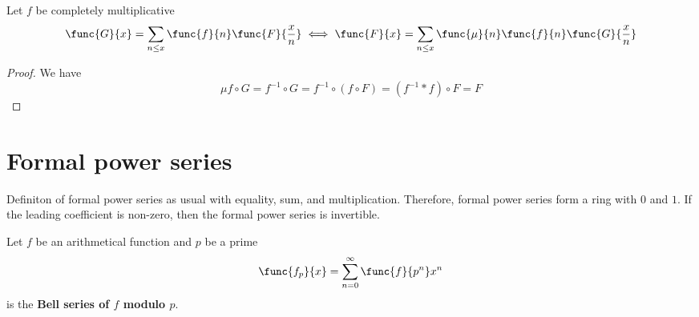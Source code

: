 \begin{theorem}
    Let \(f\) be completely multiplicative 
    \begin{equation*}
        \func{G}{x} = \sum_{n \leq x} \func{f}{n}\func{F}{\frac{x}{n}} \iff \func{F}{x} = \sum_{n \leq x} \func{\mu}{n} \func{f}{n} \func{G}{\frac{x}{n}}
    \end{equation*}    
\end{theorem}
\begin{proof}
    We have 
    \begin{equation*}
        \mu f \circ G= f^{-1} \circ G  =  f^{-1}  \circ (f \circ F) = ( f^{-1} \ast f )\circ F = F
    \end{equation*}
\end{proof}
\section{Formal power series}
Definiton of formal power series as usual with equality, sum, and multiplication. Therefore, formal power series form a ring with \(0\) and \(1\). If the leading coefficient is non-zero, then the formal power series is invertible. 
\begin{definition}
    Let \(f\) be an arithmetical function and \(p\) be a prime 
    \begin{equation*}
        \func{f_p}{x} = \sum_{n = 0}^{\infty} \func{f}{p^n}x^n
    \end{equation*}
    is the \textbf{Bell series of \(f\) modulo \(p\)}.
\end{definition}

